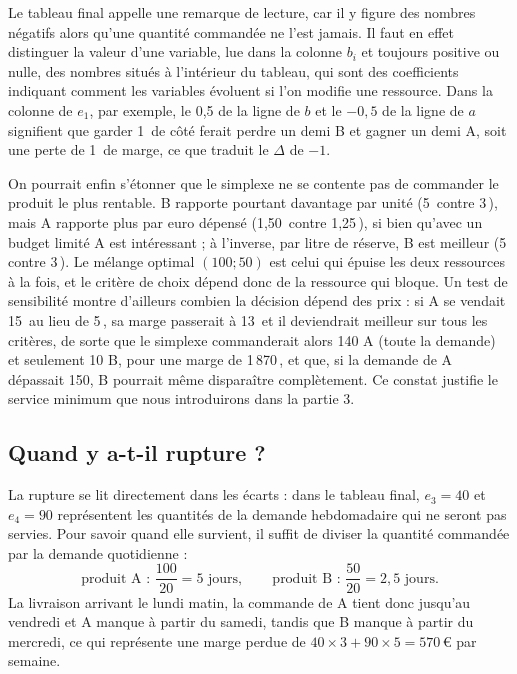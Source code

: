 \documentclass[11pt,a4paper]{article}
\newcommand{\eur}{\,\text{€}}
\begin{document}
Le tableau final appelle une remarque de lecture, car il y figure des nombres négatifs alors
qu'une quantité commandée ne l'est jamais. Il faut en effet distinguer la valeur d'une
variable, lue dans la colonne $b_i$ et toujours positive ou nulle, des nombres situés à
l'intérieur du tableau, qui sont des coefficients indiquant comment les variables évoluent si
l'on modifie une ressource. Dans la colonne de $e_1$, par exemple, le 0,5 de la ligne de $b$
et le $-0{,}5$ de la ligne de $a$ signifient que garder 1\eur{} de côté ferait perdre un demi B
et gagner un demi A, soit une perte de 1\eur{} de marge, ce que traduit le $\Delta$ de $-1$.

On pourrait enfin s'étonner que le simplexe ne se contente pas de commander le produit le plus
rentable. B rapporte pourtant davantage par unité (5\eur{} contre 3\eur), mais A rapporte plus
par euro dépensé (1,50\eur{} contre 1,25\eur), si bien qu'avec un budget limité A est
intéressant ; à l'inverse, par litre de réserve, B est meilleur (5\eur{} contre 3\eur). Le
mélange optimal $(100 ; 50)$ est celui qui épuise les deux ressources à la fois, et le
critère de choix dépend donc de la ressource qui bloque. Un test de sensibilité montre
d'ailleurs combien la décision dépend des prix : si A se vendait 15\eur{} au lieu de 5\eur, sa
marge passerait à 13\eur{} et il deviendrait meilleur sur tous les critères, de sorte que le
simplexe commanderait alors 140 A (toute la demande) et seulement 10 B, pour une marge de
1\,870\eur, et que, si la demande de A dépassait 150, B pourrait même disparaître
complètement. Ce constat justifie le service minimum que nous introduirons dans la partie 3.

\subsection{Quand y a-t-il rupture ?}
La rupture se lit directement dans les écarts : dans le tableau final, $e_3 = 40$ et
$e_4 = 90$ représentent les quantités de la demande hebdomadaire qui ne seront pas servies.
Pour savoir quand elle survient, il suffit de diviser la quantité commandée par la demande
quotidienne :
\[
\text{produit A : } \frac{100}{20} = 5 \text{ jours},
\qquad
\text{produit B : } \frac{50}{20} = 2{,}5 \text{ jours}.
\]
La livraison arrivant le lundi matin, la commande de A tient donc jusqu'au vendredi et A manque
à partir du samedi, tandis que B manque à partir du mercredi, ce qui représente une marge
perdue de $40 \times 3 + 90 \times 5 = 570\eur$ par semaine.
\end{document}
